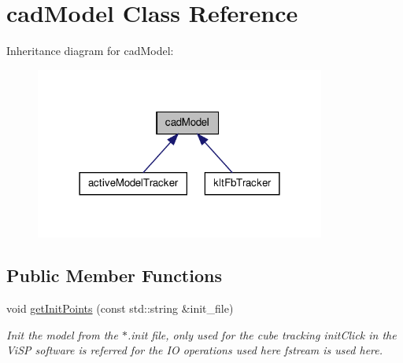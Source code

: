 \hypertarget{classcadModel}{\section{cad\-Model \-Class \-Reference}
\label{classcadModel}
}


\-Inheritance diagram for cad\-Model\-:
\nopagebreak
\begin{figure}[H]
\begin{center}
\leavevmode
\includegraphics[width=270pt]{classcadModel__inherit__graph}
\end{center}
\end{figure}
\subsection*{\-Public \-Member \-Functions}
\begin{DoxyCompactItemize}
\item 
\hypertarget{classcadModel_ae3d972106caa18f05da2296f38cd13ef}{void \hyperlink{classcadModel_ae3d972106caa18f05da2296f38cd13ef}{get\-Init\-Points} (const std\-::string \&init\-\_\-file)}\label{classcadModel_ae3d972106caa18f05da2296f38cd13ef}

\begin{DoxyCompactList}\small\item\em \-Init the model from the $\ast$.init file, only used for the cube tracking init\-Click in the \-Vi\-S\-P software is referred for the \-I\-O operations used here fstream is used here. \end{DoxyCompactList}\end{DoxyCompactItemize}
